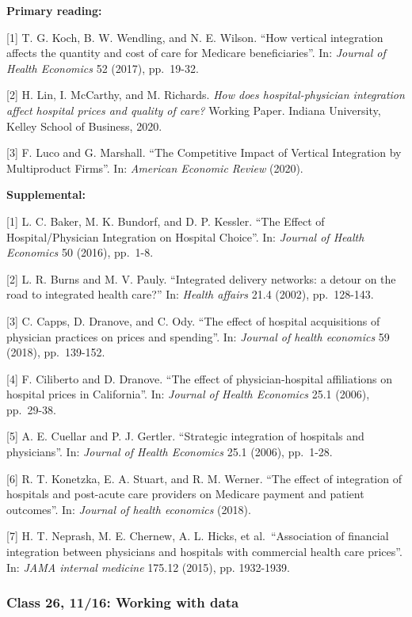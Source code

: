 \documentclass[11pt,]{article}
\begin{document}
\textbf{Primary reading:}

{[}1{]} T. G. Koch, B. W. Wendling, and N. E. Wilson. ``How vertical
integration affects the quantity and cost of care for Medicare
beneficiaries''. In: \emph{Journal of Health Economics} 52 (2017),
pp.~19-32.

{[}2{]} H. Lin, I. McCarthy, and M. Richards. \emph{How does
hospital-physician integration affect hospital prices and quality of
care?} Working Paper. Indiana University, Kelley School of Business,
2020.

{[}3{]} F. Luco and G. Marshall. ``The Competitive Impact of Vertical
Integration by Multiproduct Firms''. In: \emph{American Economic Review}
(2020).

\textbf{Supplemental:}

{[}1{]} L. C. Baker, M. K. Bundorf, and D. P. Kessler. ``The Effect of
Hospital/Physician Integration on Hospital Choice''. In: \emph{Journal
of Health Economics} 50 (2016), pp.~1-8.

{[}2{]} L. R. Burns and M. V. Pauly. ``Integrated delivery networks: a
detour on the road to integrated health care?'' In: \emph{Health
affairs} 21.4 (2002), pp.~128-143.

{[}3{]} C. Capps, D. Dranove, and C. Ody. ``The effect of hospital
acquisitions of physician practices on prices and spending''. In:
\emph{Journal of health economics} 59 (2018), pp.~139-152.

{[}4{]} F. Ciliberto and D. Dranove. ``The effect of physician-hospital
affiliations on hospital prices in California''. In: \emph{Journal of
Health Economics} 25.1 (2006), pp.~29-38.

{[}5{]} A. E. Cuellar and P. J. Gertler. ``Strategic integration of
hospitals and physicians''. In: \emph{Journal of Health Economics} 25.1
(2006), pp.~1-28.

{[}6{]} R. T. Konetzka, E. A. Stuart, and R. M. Werner. ``The effect of
integration of hospitals and post-acute care providers on Medicare
payment and patient outcomes''. In: \emph{Journal of health economics}
(2018).

{[}7{]} H. T. Neprash, M. E. Chernew, A. L. Hicks, et al.~``Association
of financial integration between physicians and hospitals with
commercial health care prices''. In: \emph{JAMA internal medicine}
175.12 (2015), pp. 1932-1939.

\hypertarget{class-26-1116-working-with-data}{%
\subsubsection{Class 26, 11/16: Working with
data}\label{class-26-1116-working-with-data}}
\end{document}
